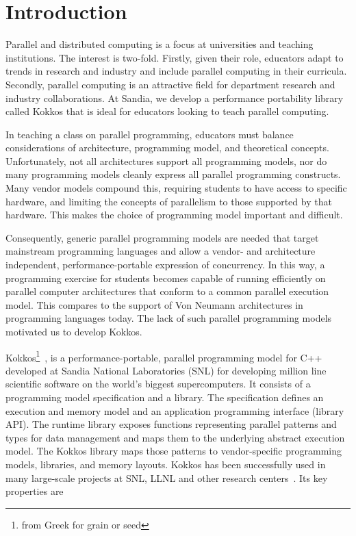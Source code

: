 
\section{Introduction}\label{chap:introduction}

Parallel and distributed computing is a focus at universities and teaching institutions. The interest is two-fold. Firstly, given their role, educators adapt to trends in research and industry and include parallel computing in their curricula. Secondly, parallel computing is an attractive field for department research and industry collaborations. At Sandia, we develop a performance portability library called Kokkos that is ideal for educators looking to teach parallel computing.

In teaching a class on parallel programming, educators must balance considerations of architecture, programming model, and theoretical concepts. Unfortunately, not all architectures support all programming models, nor do many programming models cleanly express all parallel programming constructs. Many vendor models compound this, requiring students to have access to specific hardware, and limiting the concepts of parallelism to those supported by that hardware. This makes the choice of programming model important and difficult.

Consequently, generic parallel programming models are needed that target mainstream programming languages and allow a vendor- and architecture independent, performance-portable expression of concurrency. In this way, a programming exercise for students becomes capable of running efficiently on parallel computer architectures that conform to a common parallel execution model. This compares to the support of Von Neumann architectures in programming languages today. The lack of such parallel programming models motivated us to develop Kokkos.

Kokkos\footnote{from Greek for grain or seed}~\cite{KOKKOS_PAPER_HERE}, is a performance-portable, parallel programming model for C++ developed at Sandia National Laboratories (SNL) for developing million line scientific software on the world's biggest supercomputers. It consists of a programming model specification and a library. The specification defines an execution and memory model and an application programming interface (library API). The runtime library exposes functions representing parallel patterns and types for data management and maps them to the underlying abstract execution model. The Kokkos library maps those patterns to vendor-specific programming models, libraries, and memory layouts. Kokkos has been successfully used in many large-scale projects at SNL, LLNL and other research centers~\cite{CITEKOKKOSUSECASES}. Its key properties are

